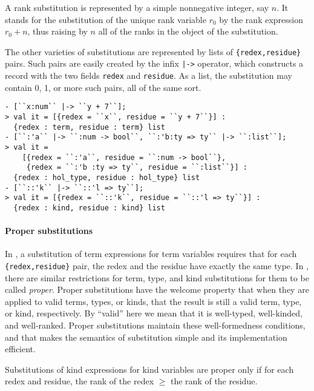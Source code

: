 A rank substitution is represented by a simple nonnegative integer, say $n$.
It stands for the substitution of the unique rank variable $r_0$ by the 
rank expression $r_0 + n$, thus raising by $n$ all of the ranks in the object
of the substitution.

The other varieties of substitutions are represented by \ML{} lists of
\texttt{\{redex,residue\}} pairs.  Such pairs are easily created by the 
infix \texttt{|->} operator, which constructs a record with the two
fields \texttt{redex} and \texttt{residue}.  As a list, the substitution
may contain 0, 1, or more such pairs, all of the same sort.
%
\begin{session}
\begin{verbatim}
- [``x:num`` |-> ``y + 7``];
> val it = [{redex = ``x``, residue = ``y + 7``}] :
  {redex : term, residue : term} list
- [``:'a`` |-> ``:num -> bool``, ``:'b:ty => ty`` |-> ``:list``];
> val it =
    [{redex = ``:'a``, residue = ``:num -> bool``},
     {redex = ``:'b :ty => ty``, residue = ``:list``}] :
  {redex : hol_type, residue : hol_type} list
- [``::'k`` |-> ``::'l => ty``];
> val it = [{redex = ``::'k``, residue = ``::'l => ty``}] :
  {redex : kind, residue : kind} list
\end{verbatim}
\end{session}

\paragraph{Proper substitutions}

In \HOL, a substitution of term expressions for term variables requires that
for each \texttt{\{redex,residue\}} pair, the redex and the residue
have exactly the same type.  In \HOLW, there are similar restrictions for
term, type, and kind substitutions for them to be called {\it proper}.
Proper substitutions have the welcome property that when they are applied
to valid terms, types, or kinds, that the result is still a valid term,
type, or kind, respectively. By ``valid'' here we mean that it is well-typed,
well-kinded, and well-ranked.  Proper substitutions maintain these
well-formedness conditions, and that makes the semantics of substitution
simple and its implementation efficient.

Substitutions of kind expressions for kind variables are proper only if
for each redex and residue, the rank of the redex $\ge$ the rank of the residue.


